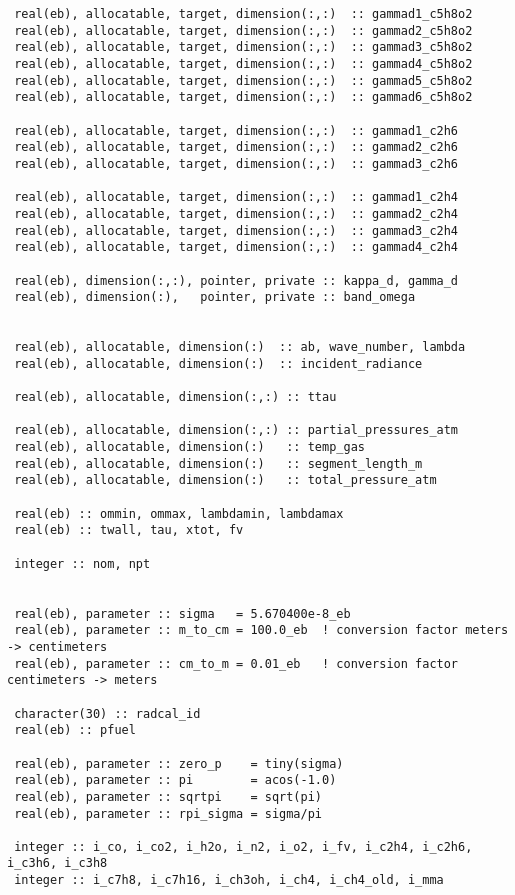 \begin{lstlisting}
 real(eb), allocatable, target, dimension(:,:)  :: gammad1_c5h8o2
 real(eb), allocatable, target, dimension(:,:)  :: gammad2_c5h8o2
 real(eb), allocatable, target, dimension(:,:)  :: gammad3_c5h8o2
 real(eb), allocatable, target, dimension(:,:)  :: gammad4_c5h8o2
 real(eb), allocatable, target, dimension(:,:)  :: gammad5_c5h8o2
 real(eb), allocatable, target, dimension(:,:)  :: gammad6_c5h8o2

 real(eb), allocatable, target, dimension(:,:)  :: gammad1_c2h6
 real(eb), allocatable, target, dimension(:,:)  :: gammad2_c2h6
 real(eb), allocatable, target, dimension(:,:)  :: gammad3_c2h6

 real(eb), allocatable, target, dimension(:,:)  :: gammad1_c2h4
 real(eb), allocatable, target, dimension(:,:)  :: gammad2_c2h4
 real(eb), allocatable, target, dimension(:,:)  :: gammad3_c2h4
 real(eb), allocatable, target, dimension(:,:)  :: gammad4_c2h4

 real(eb), dimension(:,:), pointer, private :: kappa_d, gamma_d
 real(eb), dimension(:),   pointer, private :: band_omega


 real(eb), allocatable, dimension(:)  :: ab, wave_number, lambda
 real(eb), allocatable, dimension(:)  :: incident_radiance

 real(eb), allocatable, dimension(:,:) :: ttau

 real(eb), allocatable, dimension(:,:) :: partial_pressures_atm
 real(eb), allocatable, dimension(:)   :: temp_gas
 real(eb), allocatable, dimension(:)   :: segment_length_m
 real(eb), allocatable, dimension(:)   :: total_pressure_atm

 real(eb) :: ommin, ommax, lambdamin, lambdamax
 real(eb) :: twall, tau, xtot, fv

 integer :: nom, npt


 real(eb), parameter :: sigma   = 5.670400e-8_eb
 real(eb), parameter :: m_to_cm = 100.0_eb  ! conversion factor meters -> centimeters
 real(eb), parameter :: cm_to_m = 0.01_eb   ! conversion factor centimeters -> meters

 character(30) :: radcal_id
 real(eb) :: pfuel

 real(eb), parameter :: zero_p    = tiny(sigma)
 real(eb), parameter :: pi        = acos(-1.0)
 real(eb), parameter :: sqrtpi    = sqrt(pi)
 real(eb), parameter :: rpi_sigma = sigma/pi

 integer :: i_co, i_co2, i_h2o, i_n2, i_o2, i_fv, i_c2h4, i_c2h6, i_c3h6, i_c3h8
 integer :: i_c7h8, i_c7h16, i_ch3oh, i_ch4, i_ch4_old, i_mma


\end{lstlisting}

